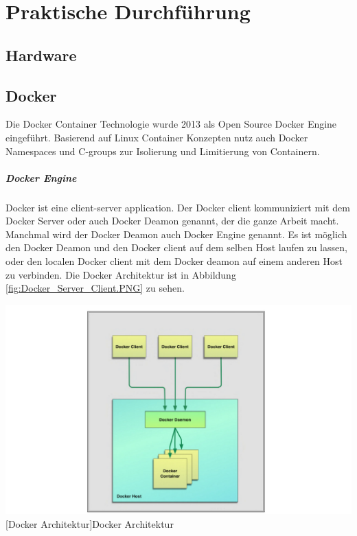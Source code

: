 \thispagestyle{empty}
\section{Praktische Durchführung}
\subsection{Hardware}


\pagebreak
\subsection{Docker}
Die Docker Container Technologie wurde 2013 als Open Source Docker Engine eingeführt. Basierend auf Linux Container Konzepten nutz auch Docker Namespaces und C-groups zur Isolierung und Limitierung von Containern.  

\subparagraph{Docker Engine}
Docker ist eine client-server application. Der Docker client kommuniziert mit dem Docker Server oder auch Docker Deamon genannt, der die ganze Arbeit macht. Manchmal wird der Docker Deamon auch Docker Engine genannt. Es ist möglich den Docker Deamon und den Docker client auf dem selben Host laufen zu lassen, oder den localen Docker client mit dem Docker deamon auf einem anderen Host zu verbinden. Die Docker Architektur ist in Abbildung \ref{fig:Docker_Server_Client.PNG} zu sehen\cite{Turnbull2015TheBook}.

\vspace{1em}
\begin{minipage}{\linewidth}
	\centering
	\includegraphics[width=1\linewidth]{pics/Docker_Server_Client.PNG}
	[Docker Architektur\cite{Turnbull2015TheBook}]{Docker Architektur}
	\label{fig:Docker_Server_Client.PNG}
\end{minipage}

